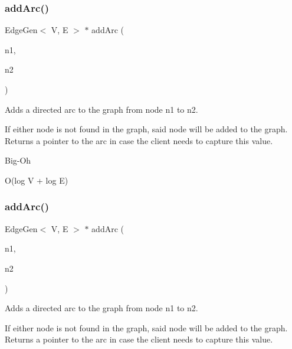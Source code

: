 \subsubsection{\texorpdfstring{add\+Arc()}{addArc()}\hspace{0.1cm}{\footnotesize\ttfamily [1/3]}}
{\footnotesize\ttfamily Edge\+Gen$<$ V, E $>$  $\ast$ add\+Arc (\begin{DoxyParamCaption}\item[{const std\+::string \&}]{n1,  }\item[{const std\+::string \&}]{n2 }\end{DoxyParamCaption})\hspace{0.3cm}{\ttfamily [inherited]}}



Adds a directed arc to the graph from node n1 to n2. 

If either node is not found in the graph, said node will be added to the graph. Returns a pointer to the arc in case the client needs to capture this value. \begin{DoxyRefDesc}{Big-\/\+Oh}
\item[\mbox{\hyperlink{BigOh__BigOh000042}{Big-\/\+Oh}}]O(log V + log E) \end{DoxyRefDesc}
\mbox{\label{classGraph_a7280d3cd76bab82df392ba91ed5257c6}} 
\subsubsection{\texorpdfstring{add\+Arc()}{addArc()}\hspace{0.1cm}{\footnotesize\ttfamily [2/3]}}
{\footnotesize\ttfamily Edge\+Gen$<$ V, E $>$  $\ast$ add\+Arc (\begin{DoxyParamCaption}\item[{\mbox{\hyperlink{classVertexGen}{Vertex\+Gen}}$<$ V, E $>$  $\ast$}]{n1,  }\item[{\mbox{\hyperlink{classVertexGen}{Vertex\+Gen}}$<$ V, E $>$  $\ast$}]{n2 }\end{DoxyParamCaption})\hspace{0.3cm}{\ttfamily [inherited]}}



Adds a directed arc to the graph from node n1 to n2. 

If either node is not found in the graph, said node will be added to the graph. Returns a pointer to the arc in case the client needs to capture this value.


